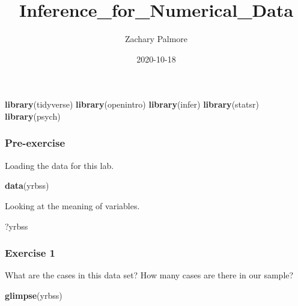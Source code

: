 \documentclass[
]{article}
\title{Inference\_for\_Numerical\_Data}
\author{Zachary Palmore}
\date{2020-10-18}
\newenvironment{Shaded}{\begin{snugshade}}{\end{snugshade}}
\newcommand{\KeywordTok}[1]{\textcolor[rgb]{0.13,0.29,0.53}{\textbf{#1}}}
\newcommand{\NormalTok}[1]{#1}
\begin{document}
\maketitle

\begin{Shaded}
\begin{Highlighting}[]
\KeywordTok{library}\NormalTok{(tidyverse)}
\KeywordTok{library}\NormalTok{(openintro)}
\KeywordTok{library}\NormalTok{(infer)}
\KeywordTok{library}\NormalTok{(statsr)}
\KeywordTok{library}\NormalTok{(psych)}
\end{Highlighting}
\end{Shaded}

\hypertarget{pre-exercise}{%
\subsubsection{Pre-exercise}\label{pre-exercise}}

Loading the data for this lab.

\begin{Shaded}
\begin{Highlighting}[]
\KeywordTok{data}\NormalTok{(yrbss)}
\end{Highlighting}
\end{Shaded}

Looking at the meaning of variables.

\begin{Shaded}
\begin{Highlighting}[]
\NormalTok{?yrbss}
\end{Highlighting}
\end{Shaded}

\hypertarget{exercise-1}{%
\subsubsection{Exercise 1}\label{exercise-1}}

What are the cases in this data set? How many cases are there in our
sample?

\begin{Shaded}
\begin{Highlighting}[]
\KeywordTok{glimpse}\NormalTok{(yrbss)}
\end{Highlighting}
\end{Shaded}
\end{document}
